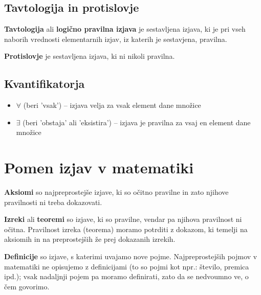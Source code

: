         
             \subsection{Tavtologija in protislovje}

                \textbf{Tavtologija} ali \textbf{logično pravilna izjava} je sestavljena izjava, 
                ki je pri vseh naborih vrednosti elementarnih izjav, iz katerih je sestavjena, pravilna.
             
                \textbf{Protislovje} je sestavljena izjava, ki ni nikoli pravilna.
             

             \subsection{Kvantifikatorja}
                \begin{itemize}
                    \item $\forall$ (beri 'vsak') -- izjava velja za vsak element dane množice
                    \item $\exists$ (beri 'obstaja' ali 'eksistira') -- izjava je pravilna za vsaj en element dane množice
                \end{itemize}
             

         

         
             \section{Pomen izjav v matematiki}
              
                \textbf{Aksiomi} so najpreprostejše izjave, ki so očitno pravilne in zato njihove 
                pravilnosti ni treba dokazovati.
             
              
                \textbf{Izreki} ali \textbf{teoremi} so izjave, ki so pravilne, vendar pa njihova 
                pravilnost ni očitna. 
                Pravilnost izreka (teorema) moramo potrditi z dokazom, ki temelji na aksiomih in na 
                preprostejših že prej dokazanih izrekih.
             
              
                \textbf{Definicije} so izjave, s katerimi uvajamo nove pojme. Najpreprostejših pojmov 
                v matematiki ne opisujemo z definicijami (to so pojmi kot npr.: število, premica ipd.); 
                vsak nadaljnji pojem pa moramo definirati, zato da se nedvoumno ve, o čem govorimo.
             

         
        

         
         